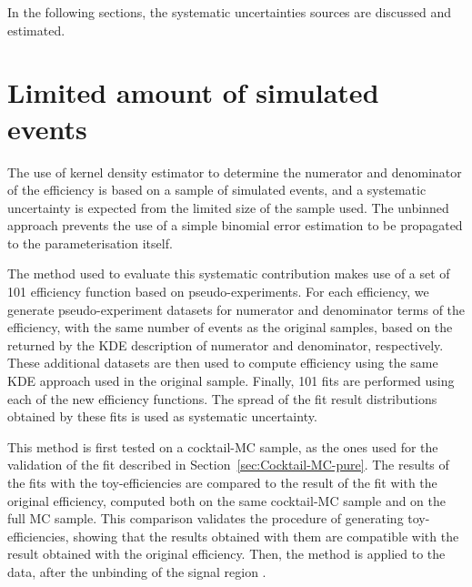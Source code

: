 In the following sections, the systematic uncertainties sources are discussed and estimated.

\section{Limited amount of simulated events}
\label{sec:sys-lim.MCstat}

The use of kernel density estimator to determine the numerator and denominator of the efficiency is based on a sample of simulated events, and a systematic uncertainty is expected from the limited size of the sample used.
The unbinned approach prevents the use of a simple binomial error estimation to be propagated to the parameterisation itself.


The method used to evaluate this systematic contribution makes use of a set of 101 efficiency function based on pseudo-experiments.
For each efficiency, we generate pseudo-experiment datasets for numerator and denominator terms of the efficiency, with the same number of events as the original samples, based on the \pdf returned by the KDE description of numerator and denominator, respectively.
These additional datasets are then used to compute efficiency using the same KDE approach used in the original sample.
Finally, 101 fits are performed using each of the new efficiency functions.
The spread of the fit result distributions obtained by these fits is used as systematic uncertainty.

This method is first tested on a cocktail-MC sample, as the ones used for the validation of the fit described in Section~\ref{sec:Cocktail-MC-pure}.
The results of the fits with the toy-efficiencies are compared to the result of the fit with the original efficiency, computed both on the same cocktail-MC sample and on the full MC sample.
This comparison validates the procedure of generating toy-efficiencies, showing that the results obtained with them are compatible with the result obtained with the original efficiency.
Then, the method is applied to the data, after the unbinding of the signal region .%

